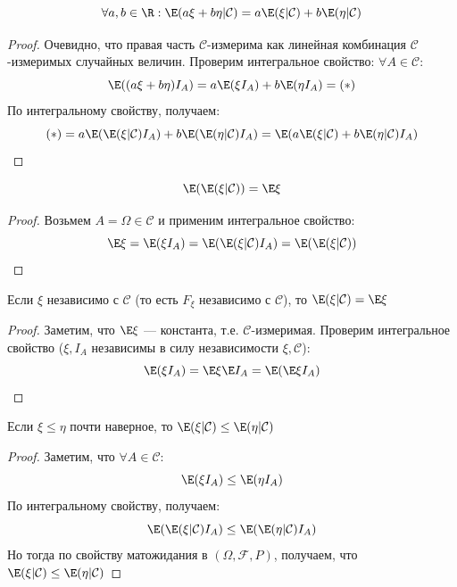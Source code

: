 \begin{proposition}[Линейность]
    \[\forall a, b \in \R: \E(a\xi + b\eta | \mathcal{C}) = a\E(\xi|\mathcal{C}) + b\E(\eta|\mathcal{C})\]
\end{proposition}
\begin{proof}
    Очевидно, что правая часть \(\mathcal{C}\)-измерима как линейная комбинация \(\mathcal{C}\)-измеримых случайных величин. Проверим интегральное свойство: \(\forall A \in \mathcal{C}\):
    \[\E((a\xi + b\eta) I_A) = a\E(\xi I_A) + b \E(\eta I_A)= (*)\]
    По интегральному свойству, получаем:
    \[(*) = a\E(\E(\xi|\mathcal{C})I_A) + b\E(\E(\eta|\mathcal{C})I_A) = \E(a\E(\xi|\mathcal{C}) + b\E(\eta|\mathcal{C}) I_A)\]
\end{proof}

\begin{proposition}
    \[\E(\E(\xi|\mathcal{C})) = \E\xi\]
\end{proposition}
\begin{proof}
    Возьмем \(A = \Omega \in \mathcal{C}\) и применим интегральное свойство:
    \[\E\xi = \E(\xi I_A) = \E(\E(\xi|\mathcal{C})I_A) = \E(\E(\xi|\mathcal{C}))\]
\end{proof}

\begin{proposition}
    Если \(\xi\) независимо с \(\mathcal{C}\) (то есть \(F_\xi\) независимо с \(\mathcal{C}\)), то \(\E(\xi|\mathcal{C}) = \E\xi\)
\end{proposition}
\begin{proof}
    Заметим, что \(\E\xi\) --- константа, т.е. \(\mathcal{C}\)-измеримая. Проверим интегральное свойство (\(\xi, I_A\) независимы в силу независимости \(\xi, \mathcal{C}\)):
    \[\E(\xi I_A) = \E\xi \E I_A = \E(\E \xi I_A)\]
\end{proof}

\begin{proposition}
    Если \(\xi \le \eta\) почти наверное, то \(\E(\xi|\mathcal{C}) \le \E(\eta|\mathcal{C})\)
\end{proposition}
\begin{proof}
    Заметим, что \(\forall A \in \mathcal{C}\):
    \[\E(\xi I_A) \le \E(\eta I_A)\]
    По интегральному свойству, получаем:
    \[\E(\E(\xi|\mathcal{C})I_A) \le \E(\E(\eta|\mathcal{C})I_A)\]
    Но тогда по свойству матожидания в \((\Omega, \mathcal{F}, P)\), получаем, что \(\E(\xi|\mathcal{C}) \le \E(\eta|\mathcal{C})\)
\end{proof}

